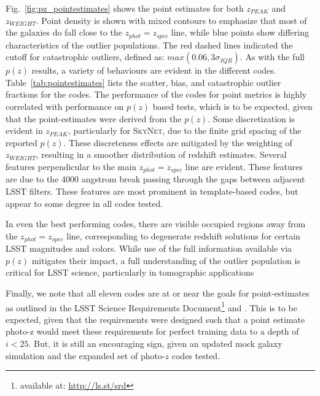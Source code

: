 \documentclass[usenatbib]{mn2e}
\newcommand{\red}[1]{\textcolor{red}{#1}}
\newcommand{\scc}[1]{\textcolor{scc}{#1}}%
\begin{document}
Fig.~\ref{fig:pz_pointestimates}  shows the point estimates for both $z_{PEAK}$ and $z_{WEIGHT}$.  Point density is shown with mixed contours to emphasize that most of the galaxies do fall close to the $z_{phot}=z_{spec}$ line, while blue points show differing characteristics of the outlier populations.  The red dashed lines indicated the cutoff for catastrophic outliers, defined as: $max(0.06,3\sigma_{IQR})$.  As with the full $p(z)$ results, a variety of behaviours are evident in the different codes.  Table~\ref{tab:pointestimates} lists the scatter, bias, and catastrophic outlier fractions for the codes.  The performance of the codes for point metrics is highly correlated with performance on $p(z)$ based tests, which is to be expected, given that the point-estimates were derived from the $p(z)$.  Some discretization is evident in $z_{PEAK}$, particularly for \textsc{SkyNet}, due to the finite grid spacing of the reported $p(z)$.  These discreteness effects are mitigated by the weighting of $z_{WEIGHT}$, resulting in a smoother distribution of redshift estimates.  Several features perpendicular to the main $z_{phot}=z_{spec}$ line are evident.  These features are due to the 4000 angstrom break passing through the gaps between adjacent LSST filters.  These features are most prominent in template-based codes, but appear to some degree in all codes tested.  

In even the best performing codes, there are visible occupied regions away from the $z_{phot}=z_{spec}$ line, corresponding to degenerate redshift solutions for certain LSST magnitudes and colors.  While use of the full information available via $p(z)$ mitigates their impact, a full understanding of the outlier population is critical for LSST science, particularly in tomographic applications %

Finally, we note that all eleven codes are at or near the goals for point-estimates as outlined in the LSST Science Requirements Document\footnote{available at: \url{http://ls.st/srd}} and \citet{Graham:17}.  This is to be expected, given that the requirements were designed such that a point estimate photo-z would meet these requirements for perfect training data to a depth of $i<25$.  But, it is still an encouraging sign, given an updated mock galaxy simulation and the expanded set of photo-$z$ codes tested.
\end{document}
